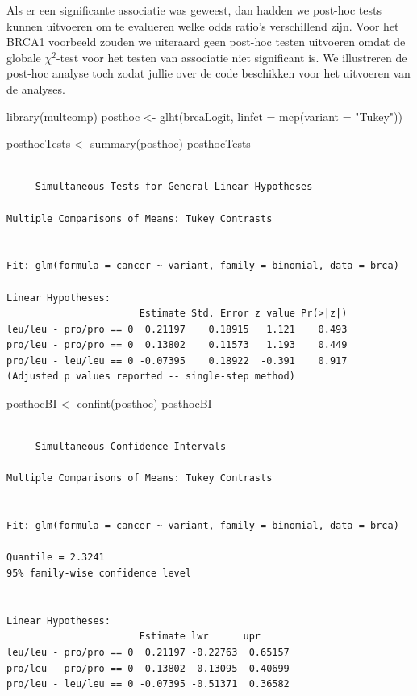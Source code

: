 \documentclass[
  dutch,
  letterpaper,
  12pt]{book}
\newenvironment{Shaded}{\begin{snugshade}}{\end{snugshade}}
\newcommand{\AttributeTok}[1]{\textcolor[rgb]{0.40,0.45,0.13}{#1}}
\newcommand{\FunctionTok}[1]{\textcolor[rgb]{0.28,0.35,0.67}{#1}}
\newcommand{\NormalTok}[1]{\textcolor[rgb]{0.00,0.23,0.31}{#1}}
\newcommand{\OtherTok}[1]{\textcolor[rgb]{0.00,0.23,0.31}{#1}}
\newcommand{\StringTok}[1]{\textcolor[rgb]{0.13,0.47,0.30}{#1}}
\theoremstyle{definition}
\theoremstyle{definition}
\theoremstyle{definition}
\theoremstyle{remark}
\begin{document}
Als er een significante associatie was geweest, dan hadden we post-hoc
tests kunnen uitvoeren om te evalueren welke odds ratio's verschillend
zijn. Voor het BRCA1 voorbeeld zouden we uiteraard geen post-hoc testen
uitvoeren omdat de globale \(\chi^2\)-test voor het testen van
associatie niet significant is. We illustreren de post-hoc analyse toch
zodat jullie over de code beschikken voor het uitvoeren van de analyses.

\begin{Shaded}
\begin{Highlighting}[]
\FunctionTok{library}\NormalTok{(multcomp)}
\NormalTok{posthoc }\OtherTok{\textless{}{-}} \FunctionTok{glht}\NormalTok{(brcaLogit,}
  \AttributeTok{linfct =} \FunctionTok{mcp}\NormalTok{(}\AttributeTok{variant =} \StringTok{"Tukey"}\NormalTok{))}

\NormalTok{posthocTests }\OtherTok{\textless{}{-}} \FunctionTok{summary}\NormalTok{(posthoc)}
\NormalTok{posthocTests}
\end{Highlighting}
\end{Shaded}

\begin{verbatim}

     Simultaneous Tests for General Linear Hypotheses

Multiple Comparisons of Means: Tukey Contrasts


Fit: glm(formula = cancer ~ variant, family = binomial, data = brca)

Linear Hypotheses:
                       Estimate Std. Error z value Pr(>|z|)
leu/leu - pro/pro == 0  0.21197    0.18915   1.121    0.493
pro/leu - pro/pro == 0  0.13802    0.11573   1.193    0.449
pro/leu - leu/leu == 0 -0.07395    0.18922  -0.391    0.917
(Adjusted p values reported -- single-step method)
\end{verbatim}

\begin{Shaded}
\begin{Highlighting}[]
\NormalTok{posthocBI }\OtherTok{\textless{}{-}} \FunctionTok{confint}\NormalTok{(posthoc)}
\NormalTok{posthocBI}
\end{Highlighting}
\end{Shaded}

\begin{verbatim}

     Simultaneous Confidence Intervals

Multiple Comparisons of Means: Tukey Contrasts


Fit: glm(formula = cancer ~ variant, family = binomial, data = brca)

Quantile = 2.3241
95% family-wise confidence level
 

Linear Hypotheses:
                       Estimate lwr      upr     
leu/leu - pro/pro == 0  0.21197 -0.22763  0.65157
pro/leu - pro/pro == 0  0.13802 -0.13095  0.40699
pro/leu - leu/leu == 0 -0.07395 -0.51371  0.36582
\end{verbatim}
\end{document}
